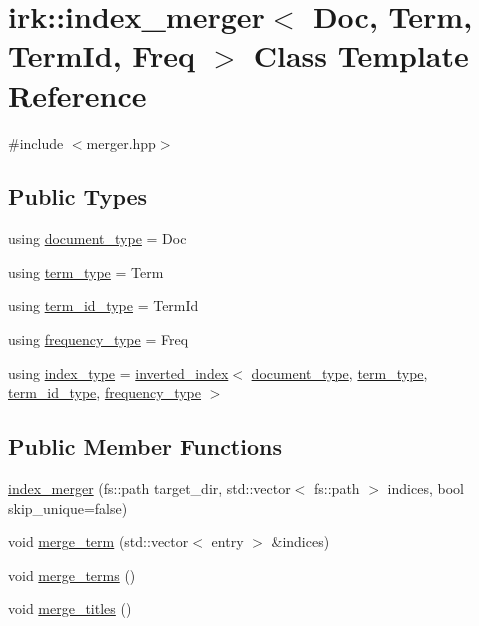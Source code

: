 \hypertarget{classirk_1_1index__merger}{}\section{irk\+:\+:index\+\_\+merger$<$ Doc, Term, Term\+Id, Freq $>$ Class Template Reference}
\label{classirk_1_1index__merger}


{\ttfamily \#include $<$merger.\+hpp$>$}

\subsection*{Public Types}
\begin{DoxyCompactItemize}
\item 
using \mbox{\hyperlink{classirk_1_1index__merger_ace9b689f5d38f6aeed3ce16f0f1bd260}{document\+\_\+type}} = Doc
\item 
using \mbox{\hyperlink{classirk_1_1index__merger_a2b76203064ec60dc3b0fa662fd8aa3f0}{term\+\_\+type}} = Term
\item 
using \mbox{\hyperlink{classirk_1_1index__merger_a3731db86b5c514a2dd44555c07abe58e}{term\+\_\+id\+\_\+type}} = Term\+Id
\item 
using \mbox{\hyperlink{classirk_1_1index__merger_a6cb409ab2e737118969206ee9b27d147}{frequency\+\_\+type}} = Freq
\item 
using \mbox{\hyperlink{classirk_1_1index__merger_ad218976b86b988db7a72b81f67d352b4}{index\+\_\+type}} = \mbox{\hyperlink{classirk_1_1inverted__index}{inverted\+\_\+index}}$<$ \mbox{\hyperlink{classirk_1_1index__merger_ace9b689f5d38f6aeed3ce16f0f1bd260}{document\+\_\+type}}, \mbox{\hyperlink{classirk_1_1index__merger_a2b76203064ec60dc3b0fa662fd8aa3f0}{term\+\_\+type}}, \mbox{\hyperlink{classirk_1_1index__merger_a3731db86b5c514a2dd44555c07abe58e}{term\+\_\+id\+\_\+type}}, \mbox{\hyperlink{classirk_1_1index__merger_a6cb409ab2e737118969206ee9b27d147}{frequency\+\_\+type}} $>$
\end{DoxyCompactItemize}
\subsection*{Public Member Functions}
\begin{DoxyCompactItemize}
\item 
\mbox{\hyperlink{classirk_1_1index__merger_af76fffe4b1bc16a692b87f07ff046aaa}{index\+\_\+merger}} (fs\+::path target\+\_\+dir, std\+::vector$<$ fs\+::path $>$ indices, bool skip\+\_\+unique=false)
\item 
void \mbox{\hyperlink{classirk_1_1index__merger_a285409fbb9e208ac3ad05076308e2826}{merge\+\_\+term}} (std\+::vector$<$ entry $>$ \&indices)
\item 
void \mbox{\hyperlink{classirk_1_1index__merger_a7109f40e5fc0213d5c72cd3eda9ccaa5}{merge\+\_\+terms}} ()
\item 
void \mbox{\hyperlink{classirk_1_1index__merger_a82a8c5def4100f2cd1be63a037a3a570}{merge\+\_\+titles}} ()
\end{DoxyCompactItemize}


